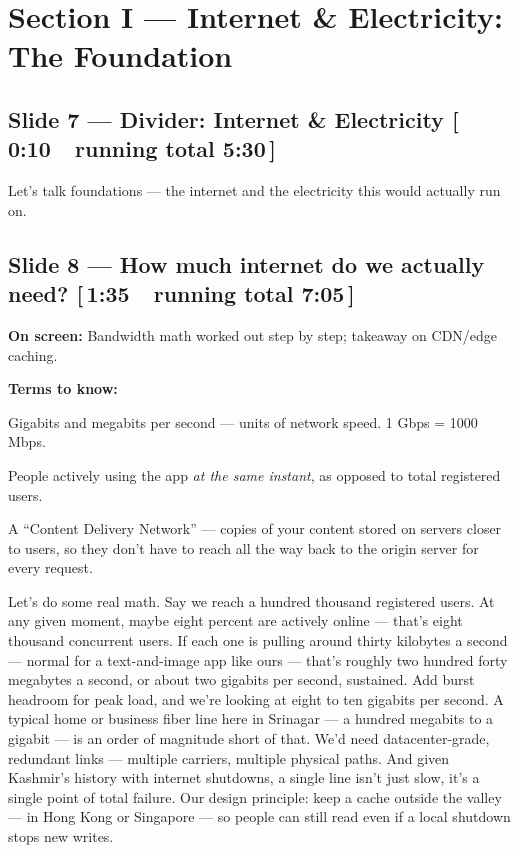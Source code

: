 \documentclass[11pt]{article}
\newcommand{\onscreen}[1]{\noindent\textbf{\color{sovGrey}On screen:} #1\par\vspace{4pt}}
\newcommand{\timing}[2]{\hfill{\normalsize\color{sovGrey}[\,#1\ \textbar\ running total #2\,]}}
\newenvironment{terms}
  {\noindent\textbf{\color{sovGrey}Terms to know:}
   \begin{description}[leftmargin=0pt,style=sameline,labelindent=0pt,itemsep=2pt,topsep=2pt,font=\normalfont\bfseries\color{sovDark}]}
  {\end{description}\vspace{2pt}}
\begin{document}
\section{Section I --- Internet \& Electricity: The Foundation}

\subsection*{Slide 7 --- Divider: Internet \& Electricity \timing{0:10}{5:30}}
\begin{sayit}
Let's talk foundations --- the internet and the electricity this would actually run on.
\end{sayit}

\subsection*{Slide 8 --- How much internet do we actually need? \timing{1:35}{7:05}}
\onscreen{Bandwidth math worked out step by step; takeaway on CDN/edge caching.}
\begin{terms}
  \item[Gbps / Mbps] Gigabits and megabits per second --- units of network speed.
    1 Gbps = 1000 Mbps.
  \item[Concurrent users] People actively using the app \emph{at the same instant},
    as opposed to total registered users.
  \item[CDN / edge cache] A ``Content Delivery Network'' --- copies of your content
    stored on servers closer to users, so they don't have to reach all the way back to
    the origin server for every request.
\end{terms}
\begin{sayit}
Let's do some real math. Say we reach a hundred thousand registered users. At any given
moment, maybe eight percent are actively online --- that's eight thousand concurrent
users. If each one is pulling around thirty kilobytes a second --- normal for a
text-and-image app like ours --- that's roughly two hundred forty megabytes a second, or
about two gigabits per second, sustained. Add burst headroom for peak load, and we're
looking at eight to ten gigabits per second. A typical home or business fiber line here
in Srinagar --- a hundred megabits to a gigabit --- is an order of magnitude short of
that. We'd need datacenter-grade, redundant links --- multiple carriers, multiple
physical paths. And given Kashmir's history with internet shutdowns, a single line isn't
just slow, it's a single point of total failure. Our design principle: keep a cache
outside the valley --- in Hong Kong or Singapore --- so people can still read even if a
local shutdown stops new writes.
\end{sayit}
\end{document}
